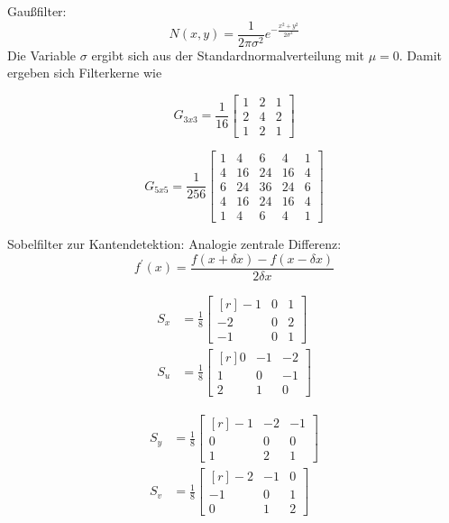 Gau\ss{}filter:
\begin{equation}
 N(x, y) = \frac{1}{2\pi\sigma^2} e^{-\frac{x^2+y^2}{2\sigma^2}}
\end{equation}
Die Variable \( \sigma \) ergibt sich aus der Standardnormalverteilung mit \( \mu=0 \). Damit ergeben sich Filterkerne wie
\begin{multicols}{2}

\begin{equation*}
 G_{3x3}=\frac{1}{16} \begin{bmatrix} 1&2&1 \\ 2&4&2 \\ 1&2&1 \end{bmatrix}
\end{equation*}
 
 \columnbreak
 \begin{equation*}
 G_{5x5}=\frac{1}{256} \begin{bmatrix} 1&4&6&4&1 \\ 4&16&24&16&4 \\ 6&24&36&24&6 \\ 4&16&24&16&4 \\ 1&4&6&4&1 \end{bmatrix}
\end{equation*}
 
\end{multicols}



Sobelfilter zur Kantendetektion:
Analogie zentrale Differenz:
\begin{equation*}
 f^\prime (x)=\frac{f(x+\delta x)-f(x-\delta x)}{2\delta x}
\end{equation*}

\begin{multicols}{2}
\begin{align*}
 S_x &= \frac{1}{8} \begin{bmatrix}[r] -1&0&1 \\ -2&0&2 \\ -1&0&1 \end{bmatrix} \\
 S_u &= \frac{1}{8} \begin{bmatrix}[r] 0&-1&-2 \\ 1&0&-1 \\ 2&1&0 \end{bmatrix}
\end{align*}

\columnbreak

\begin{align*}
 S_y &= \frac{1}{8} \begin{bmatrix}[r] -1&-2&-1 \\ 0&0&0 \\ 1&2&1 \end{bmatrix} \\
 S_v &= \frac{1}{8} \begin{bmatrix}[r] -2&-1&0 \\ -1&0&1 \\ 0&1&2 \end{bmatrix}
\end{align*}
\end{multicols}
